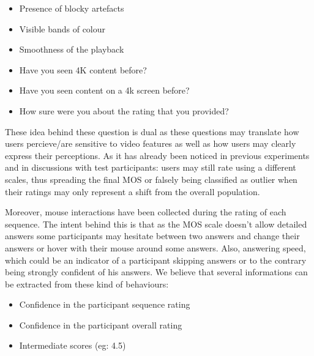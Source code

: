 \begin{itemize}
	\item Presence of blocky artefacts
	\item Visible bands of colour
	\item Smoothness of the playback
	\item Have you seen 4K content before?
	\item Have you seen content on a 4k screen before?
	\item How sure were you about the rating that you provided?
\end{itemize}




These idea behind these question is dual as these questions may translate how users percieve/are sensitive to video features as well as how users may clearly express their perceptions. As it has already been noticed in previous experiments and in discussions with test participants: users may still rate using a different scales, thus spreading the final MOS or falsely being classified as outlier when their ratings may only represent a shift from the overall population. 

Moreover, mouse interactions have been collected during the rating of each sequence. The intent behind this is that as the MOS scale doesn't allow detailed answers some participants may hesitate between two answers and change their answers or hover with their mouse around some answers. Also, answering speed, which could be an indicator of a participant skipping answers or to the contrary being strongly confident of his answers. We believe that several informations can be extracted from these kind of behaviours:
\begin{itemize}
	\item Confidence in the participant sequence rating
	\item Confidence in the participant overall rating
	\item Intermediate scores (eg: 4.5)
\end{itemize}
